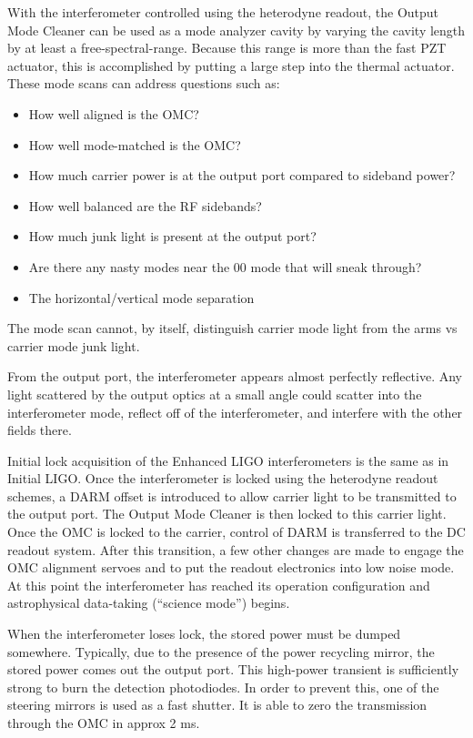 

With the interferometer controlled using the heterodyne readout, the
Output Mode Cleaner can be used as a mode analyzer cavity by varying
the cavity length by at least a free-spectral-range. Because this
range is more than the fast PZT actuator, this is accomplished by
putting a large step into the thermal actuator. These mode scans can
address questions such as:
\begin{itemize}
\item How well aligned is the OMC?
\item How well mode-matched is the OMC?
\item How much carrier power is at the output port compared to sideband
power?
\item How well balanced are the RF sidebands?
\item How much junk light is present at the output port?
\item Are there any nasty modes near the 00 mode that will sneak through?
\item The horizontal/vertical mode separation
\end{itemize}
The mode scan cannot, by itself, distinguish carrier mode light from
the arms vs carrier mode junk light.



From the output port, the interferometer appears almost perfectly
reflective.  Any light scattered by the output optics at a small angle
could scatter into the interferometer mode, reflect off of the
interferometer, and interfere with the other fields there.



Initial lock acquisition of the Enhanced LIGO interferometers is the
same as in Initial LIGO. Once the interferometer is locked using the
heterodyne readout schemes, a DARM offset is introduced to allow carrier
light to be transmitted to the output port. The Output Mode Cleaner
is then locked to this carrier light. Once the OMC is locked to the
carrier, control of DARM is transferred to the DC readout system.
After this transition, a few other changes are made to engage the
OMC alignment servoes and to put the readout electronics into low
noise mode. At this point the interferometer has reached its operation
configuration and astrophysical data-taking ({}``science mode'')
begins.



When the interferometer loses lock, the stored power must be dumped
somewhere. Typically, due to the presence of the power recycling mirror,
the stored power comes out the output port. This high-power transient
is sufficiently strong to burn the detection photodiodes. In order
to prevent this, one of the steering mirrors is used as a fast shutter.
It is able to zero the transmission through the OMC in approx 2 ms.
